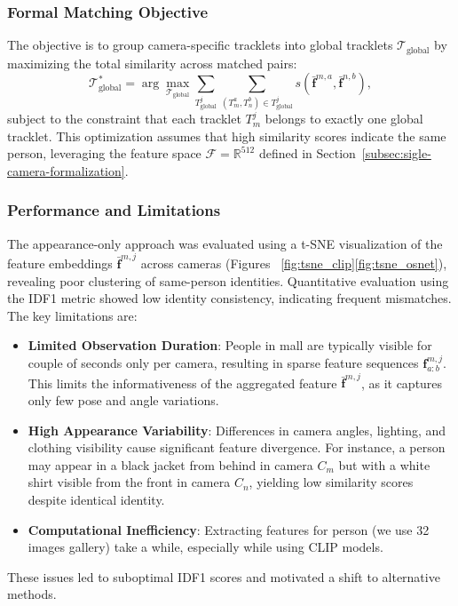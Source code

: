 \documentclass[12pt, a4paper]{article}
\begin{document}
\subsubsection{Formal Matching Objective}

The objective is to group camera-specific tracklets into global tracklets $\mathcal{T}_{\text{global}}$ by maximizing the total similarity across matched pairs:
\begin{equation}
\mathcal{T}_{\text{global}}^* = \arg\max_{\mathcal{T}_{\text{global}}} \sum_{T^j_{\text{global}}} \sum_{(T_m^a, T_n^b) \in T^j_{\text{global}}} s(\bar{\mathbf{f}}^{m,a}, \bar{\mathbf{f}}^{n,b}),
\end{equation}
subject to the constraint that each tracklet $T_m^j$ belongs to exactly one global tracklet. This optimization assumes that high similarity scores indicate the same person, leveraging the feature space $\mathcal{F} = \mathbb{R}^{512}$ defined in Section~\ref{subsec:sigle-camera-formalization}.


\subsubsection{Performance and Limitations}

The appearance-only approach was evaluated using a t-SNE visualization of the feature embeddings $\bar{\mathbf{f}}^{m,j}$ across cameras (Figures ~\ref{fig:tsne_clip}\ref{fig:tsne_osnet}), revealing poor clustering of same-person identities. Quantitative evaluation using the IDF1 metric showed low identity consistency, indicating frequent mismatches. The key limitations are:
\begin{itemize}
    \item \textbf{Limited Observation Duration}: People in mall are typically visible for couple of seconds only per camera, resulting in sparse feature sequences $\mathbf{f}_{a:b}^{m,j}$. This limits the informativeness of the aggregated feature $\bar{\mathbf{f}}^{m,j}$, as it captures only few pose and angle variations.
    \item \textbf{High Appearance Variability}: Differences in camera angles, lighting, and clothing visibility cause significant feature divergence. For instance, a person may appear in a black jacket from behind in camera $C_m$ but with a white shirt visible from the front in camera $C_n$, yielding low similarity scores despite identical identity.
    \item \textbf{Computational Inefficiency}: Extracting features for person (we use 32 images gallery) take a while, especially while using CLIP models.
\end{itemize}
These issues led to suboptimal IDF1 scores and motivated a shift to alternative methods.
\end{document}
